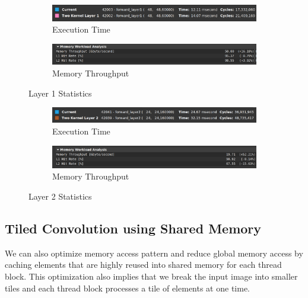 \documentclass{article}
\begin{document}
\begin{figure}[H]
    \centering
    \begin{subfigure}[b]{\linewidth}
        \includegraphics[width=\linewidth]{const_layer1_runtime}
        \caption{Execution Time}
    \end{subfigure}
    \begin{subfigure}[b]{\linewidth}
        \includegraphics[width=\linewidth]{const_layer1_mem}
        \caption{Memory Throughput}
    \end{subfigure}
    \caption{Layer 1 Statistics}
\end{figure}

\begin{figure}[H]
    \centering
    \begin{subfigure}[b]{\linewidth}
        \includegraphics[width=\linewidth]{const_layer2_runtime}
        \caption{Execution Time}
    \end{subfigure}
    \begin{subfigure}[b]{\linewidth}
        \includegraphics[width=\linewidth]{const_layer2_mem}
        \caption{Memory Throughput}
    \end{subfigure}
    \caption{Layer 2 Statistics}
\end{figure}


\subsection{Tiled Convolution using Shared Memory}
We can also optimize memory access pattern and reduce global memory access by caching
elements that are highly reused into shared memory for each thread block.
This optimization also implies that we break the input image into smaller tiles
and each thread block processes a tile of elements at one time. \\
\end{document}
